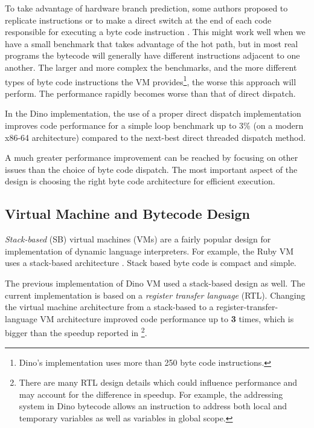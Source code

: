 \documentclass[preprint]{sigplanconf}
\begin{document}
  To take advantage of hardware branch prediction, some authors proposed
to replicate instructions or to make a direct switch
at the end of each code responsible for executing a byte code instruction \cite{Casey}.  This
might work well when we have a small benchmark that takes advantage of the hot path,
but in most real programs the bytecode will generally have different instructions adjacent to one another. %
The larger and more complex the benchmarks, and the more different types of
byte code instructions the VM provides\footnote{Dino's implementation uses more
than 250 byte code instructions.}, the worse this approach will perform.
The performance rapidly becomes worse than that of direct dispatch.

  In the Dino implementation, the use of a proper direct dispatch implementation improves
code performance for a simple loop benchmark up to 3\% (on a modern x86-64 architecture) compared to the next-best direct threaded dispatch method.

  A much greater performance improvement can be reached by focusing on other
issues than the choice of byte code dispatch.  The most important aspect of the design
is choosing the right byte code architecture for efficient execution.

\subsection{Virtual Machine and Bytecode Design}

  \emph{Stack-based} (SB) virtual machines (VMs) are a fairly popular design for
implementation of dynamic language interpreters. For example, the Ruby
VM uses a stack-based architecture \cite{Sasada} \cite{Shaughnessy}.  Stack based byte
code is compact and simple.

The previous implementation of Dino VM used a stack-based design as well.
The current implementation is based on a \emph{register transfer
  language} (RTL).  Changing the virtual machine architecture from a stack-based to
a register-transfer-language VM architecture improved code
performance up to \textbf{3} times,
which is bigger than the speedup reported
in \cite{Shi}\footnote{There are many RTL design details
  which could influence performance    
  and may account for the difference in speedup.
  For example, the addressing system in Dino bytecode
  allows an instruction to address both local and temporary variables as well as
  variables in global scope.}.
  
\end{document}
